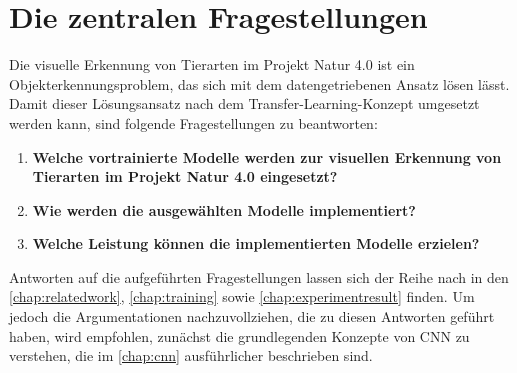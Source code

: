 \section{Die zentralen Fragestellungen}

Die visuelle Erkennung von Tierarten im Projekt Natur 4.0 ist ein Objekterkennungsproblem, das sich mit dem datengetriebenen Ansatz lösen lässt. Damit dieser Lösungsansatz nach dem Transfer-Learning-Konzept umgesetzt werden kann, sind folgende Fragestellungen zu beantworten:

\begin{enumerate}
	\item \textbf{Welche vortrainierte Modelle werden zur visuellen Erkennung von Tierarten im Projekt Natur 4.0 eingesetzt?}
	
	\item \textbf{Wie werden die ausgewählten Modelle implementiert?}
	
	\item \textbf{Welche Leistung können die implementierten Modelle erzielen?}
\end{enumerate}

Antworten auf die aufgeführten Fragestellungen lassen sich der Reihe nach in den \autoref{chap:relatedwork}, \autoref{chap:training} sowie \autoref{chap:experimentresult} finden. Um jedoch die Argumentationen nachzuvollziehen, die zu diesen Antworten geführt haben, wird empfohlen, zunächst die grundlegenden Konzepte von CNN zu verstehen, die im \autoref{chap:cnn} ausführlicher beschrieben sind.